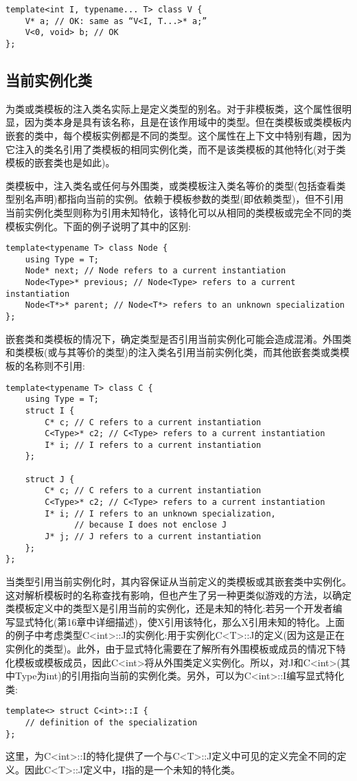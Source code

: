 \begin{lstlisting}[style=styleCXX]
template<int I, typename... T> class V {
	V* a; // OK: same as “V<I, T...>* a;”
	V<0, void> b; // OK
};
\end{lstlisting}

\subsection{当前实例化类}

为类或类模板的注入类名实际上是定义类型的别名。对于非模板类，这个属性很明显，因为类本身是具有该名称，且是在该作用域中的类型。但在类模板或类模板内嵌套的类中，每个模板实例都是不同的类型。这个属性在上下文中特别有趣，因为它注入的类名引用了类模板的相同实例化类，而不是该类模板的其他特化(对于类模板的嵌套类也是如此)。

类模板中，注入类名或任何与外围类，或类模板注入类名等价的类型(包括查看类型别名声明)都指向当前的实例。依赖于模板参数的类型(即依赖类型)，但不引用当前实例化类型则称为引用未知特化，该特化可以从相同的类模板或完全不同的类模板实例化。下面的例子说明了其中的区别:

\begin{lstlisting}[style=styleCXX]
template<typename T> class Node {
	using Type = T;
	Node* next; // Node refers to a current instantiation
	Node<Type>* previous; // Node<Type> refers to a current instantiation
	Node<T*>* parent; // Node<T*> refers to an unknown specialization
};
\end{lstlisting}

嵌套类和类模板的情况下，确定类型是否引用当前实例化可能会造成混淆。外围类和类模板(或与其等价的类型)的注入类名引用当前实例化类，而其他嵌套类或类模板的名称则不引用:

\begin{lstlisting}[style=styleCXX]
template<typename T> class C {
	using Type = T;
	struct I {
		C* c; // C refers to a current instantiation
		C<Type>* c2; // C<Type> refers to a current instantiation
		I* i; // I refers to a current instantiation
	};

	struct J {
		C* c; // C refers to a current instantiation
		C<Type>* c2; // C<Type> refers to a current instantiation
		I* i; // I refers to an unknown specialization,
			  // because I does not enclose J
		J* j; // J refers to a current instantiation
	};
};
\end{lstlisting}

当类型引用当前实例化时，其内容保证从当前定义的类模板或其嵌套类中实例化。这对解析模板时的名称查找有影响，但也产生了另一种更类似游戏的方法，以确定类模板定义中的类型X是引用当前的实例化，还是未知的特化:若另一个开发者编写显式特化(第16章中详细描述)，使X引用该特化，那么X引用未知的特化。上面的例子中考虑类型C<int>::J的实例化:用于实例化C<T>::J的定义(因为这是正在实例化的类型)。此外，由于显式特化需要在了解所有外围模板或成员的情况下特化模板或模板成员，因此C<int>将从外围类定义实例化。所以，对J和C<int>(其中Type为int)的引用指向当前的实例化类。另外，可以为C<int>::I编写显式特化类:

\begin{lstlisting}[style=styleCXX]
template<> struct C<int>::I {
	// definition of the specialization
};
\end{lstlisting}

这里，为C<int>::I的特化提供了一个与C<T>::J定义中可见的定义完全不同的定义。因此C<T>::J定义中，I指的是一个未知的特化类。


